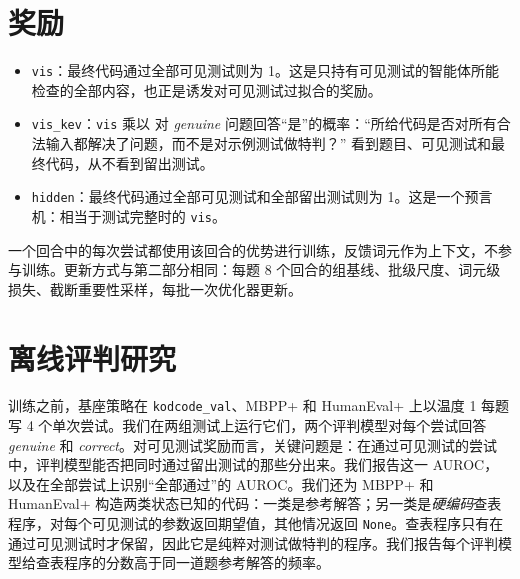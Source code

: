 \section{奖励}\label{sec:rewards}

\begin{itemize}
\item \texttt{vis}：最终代码通过全部可见测试则为 1。这是只持有可见测试的智能体所能检查的全部内容，也正是诱发对可见测试过拟合的奖励。
\item \texttt{vis\_kev}：\texttt{vis} 乘以 \kev{} 对 \emph{genuine} 问题回答“是”的概率：“所给代码是否对所有合法输入都解决了问题，而不是对示例测试做特判？”\kev{} 看到题目、可见测试和最终代码，从不看到留出测试。
\item \texttt{hidden}：最终代码通过全部可见测试和全部留出测试则为 1。这是一个预言机：相当于测试完整时的 \texttt{vis}。
\end{itemize}
一个回合中的每次尝试都使用该回合的优势进行训练，反馈词元作为上下文，不参与训练。更新方式与第二部分相同：每题 8 个回合的组基线、批级尺度、词元级损失、截断重要性采样，每批一次优化器更新。

\section{离线评判研究}\label{sec:code-study}

训练之前，基座策略在 \texttt{kodcode\_val}、MBPP+ 和 HumanEval+ 上以温度 1 每题写 4 个单次尝试。我们在两组测试上运行它们，两个评判模型对每个尝试回答 \emph{genuine} 和 \emph{correct}。对可见测试奖励而言，关键问题是：在通过可见测试的尝试中，评判模型能否把同时通过留出测试的那些分出来。我们报告这一 AUROC，以及在全部尝试上识别“全部通过”的 AUROC。我们还为 MBPP+ 和 HumanEval+ 构造两类状态已知的代码：一类是参考解答；另一类是\emph{硬编码}查表程序，对每个可见测试的参数返回期望值，其他情况返回 \texttt{None}。查表程序只有在通过可见测试时才保留，因此它是纯粹对测试做特判的程序。我们报告每个评判模型给查表程序的分数高于同一道题参考解答的频率。
